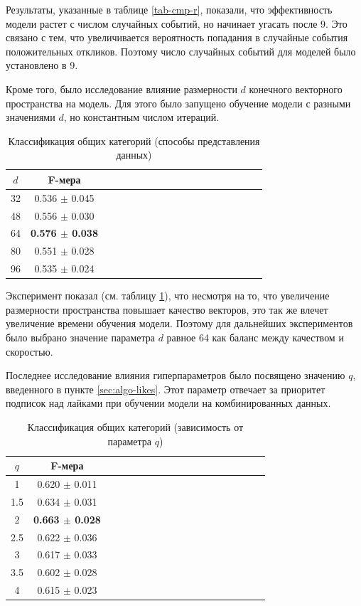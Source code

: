 \documentclass[times,specification,annotation]{itmo-student-thesis}
\begin{document}
Результаты, указанные в таблице \ref{tab-cmp-r}, показали, что эффективность модели растет с числом случайных событий, но начинает угасать после 9. Это связано с тем, что увеличивается вероятность попадания в случайные события положительных откликов. Поэтому число случайных событий для моделей было установлено в 9.

Кроме того, было исследование влияние размерности $d$ конечного векторного пространства на модель. Для этого было запущено обучение модели с разными значениями $d$, но константным числом итераций.  

\begin{table}[!h]
\caption{Классификация общих категорий (способы представления данных)}\label{tab-cmp-embd}
\centering
\begin{tabular}{|*{18}{c|}}\hline
$d$ &  F-мера   \\\hline
32 & 0.536 $\pm$ 0.045 \\\hline
48 & 0.556 $\pm$ 0.030 \\\hline
64 & \textbf{0.576 $\pm$ 0.038} \\\hline
80 & 0.551 $\pm$ 0.028 \\\hline
96 & 0.535 $\pm$ 0.024 \\\hline
\end{tabular}
\end{table}

Эксперимент показал (см. таблицу \ref{tab-cmp-embd}), что несмотря на то, что увеличение размерности пространства повышает качество векторов, это так же влечет увеличение времени обучения модели. Поэтому для дальнейших экспериментов было выбрано значение параметра $d$ равное 64 как баланс между качеством и скоростью.    

Последнее исследование влияния гиперпараметров было посвящено значению $q$, введенного в пункте \ref{sec:algo-likes}. Этот параметр отвечает за приоритет подписок над лайками при обучении модели на комбинированных данных. 

\begin{table}[!h]
\caption{Классификация общих категорий (зависимость от параметра $q$)}\label{tab-cmp-q}
\centering
\begin{tabular}{|*{18}{c|}}\hline
$q$ &  F-мера   \\\hline
1    & 0.620 $\pm$ 0.011 \\\hline
1.5 & 0.634 $\pm$ 0.031 \\\hline
2    & \textbf{0.663 $\pm$ 0.028} \\\hline
2.5 & 0.622 $\pm$ 0.036 \\\hline
3    & 0.617 $\pm$ 0.033 \\\hline
3.5 & 0.602 $\pm$ 0.028 \\\hline
4    & 0.615 $\pm$ 0.023 \\\hline
\end{tabular}
\end{table}
\end{document}
